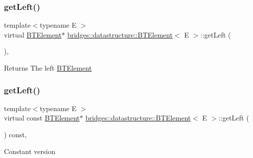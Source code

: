 \subsubsection{\texorpdfstring{getLeft()}{getLeft()}\hspace{0.1cm}{\footnotesize\ttfamily [1/2]}}
{\footnotesize\ttfamily template$<$typename E $>$ \\
virtual \mbox{\hyperlink{classbridges_1_1datastructure_1_1_b_t_element}{B\+T\+Element}}$\ast$ \mbox{\hyperlink{classbridges_1_1datastructure_1_1_b_t_element}{bridges\+::datastructure\+::\+B\+T\+Element}}$<$ E $>$\+::get\+Left (\begin{DoxyParamCaption}{ }\end{DoxyParamCaption})\hspace{0.3cm}{\ttfamily [inline]}, {\ttfamily [virtual]}}

\begin{DoxyReturn}{Returns}
The left \mbox{\hyperlink{classbridges_1_1datastructure_1_1_b_t_element}{B\+T\+Element}} 
\end{DoxyReturn}
\mbox{\label{classbridges_1_1datastructure_1_1_b_t_element_aa13df422de48c6297223c3c28caf9277}} 
\subsubsection{\texorpdfstring{getLeft()}{getLeft()}\hspace{0.1cm}{\footnotesize\ttfamily [2/2]}}
{\footnotesize\ttfamily template$<$typename E $>$ \\
virtual const \mbox{\hyperlink{classbridges_1_1datastructure_1_1_b_t_element}{B\+T\+Element}}$\ast$ \mbox{\hyperlink{classbridges_1_1datastructure_1_1_b_t_element}{bridges\+::datastructure\+::\+B\+T\+Element}}$<$ E $>$\+::get\+Left (\begin{DoxyParamCaption}{ }\end{DoxyParamCaption}) const\hspace{0.3cm}{\ttfamily [inline]}, {\ttfamily [virtual]}}

Constant version \mbox{\label{classbridges_1_1datastructure_1_1_b_t_element_a3f73fcc5a7ed1af1a628803879682f80}} 
